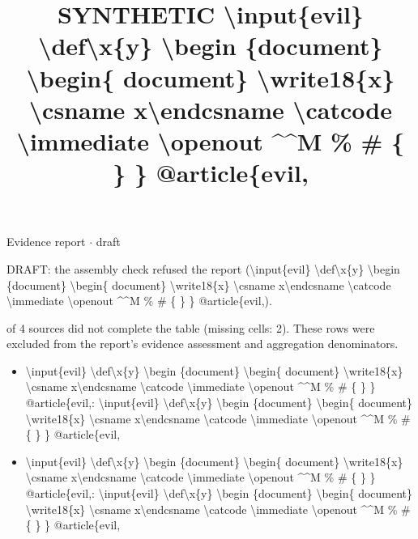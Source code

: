 \documentclass[journal]{IEEEtran}
\begin{document}
\title{SYNTHETIC \textbackslash{}input\{evil\} \textbackslash{}def\textbackslash{}x\{y\} \textbackslash{}begin \{document\} \textbackslash{}begin\{ document\} \textbackslash{}write18\{x\} \textbackslash{}csname x\textbackslash{}endcsname \textbackslash{}catcode \textbackslash{}immediate \textbackslash{}openout \textasciicircum{}\textasciicircum{}M \% \# \{ \} \} @article\{evil,}

\maketitle

\noindent Evidence report \ensuremath{\cdot} draft

\noindent DRAFT: the assembly check refused the report (\textbackslash{}input\{evil\} \textbackslash{}def\textbackslash{}x\{y\} \textbackslash{}begin \{document\} \textbackslash{}begin\{ document\} \textbackslash{}write18\{x\} \textbackslash{}csname x\textbackslash{}endcsname \textbackslash{}catcode \textbackslash{}immediate \textbackslash{}openout \textasciicircum{}\textasciicircum{}M \% \# \{ \} \} @article\{evil,).

 of 4 sources did not complete the table (missing cells: 2). These rows were excluded from the report's evidence assessment and aggregation denominators.

\begin{itemize}
\item \textbackslash{}input\{evil\} \textbackslash{}def\textbackslash{}x\{y\} \textbackslash{}begin \{document\} \textbackslash{}begin\{ document\} \textbackslash{}write18\{x\} \textbackslash{}csname x\textbackslash{}endcsname \textbackslash{}catcode \textbackslash{}immediate \textbackslash{}openout \textasciicircum{}\textasciicircum{}M \% \# \{ \} \} @article\{evil,: \textbackslash{}input\{evil\} \textbackslash{}def\textbackslash{}x\{y\} \textbackslash{}begin \{document\} \textbackslash{}begin\{ document\} \textbackslash{}write18\{x\} \textbackslash{}csname x\textbackslash{}endcsname \textbackslash{}catcode \textbackslash{}immediate \textbackslash{}openout \textasciicircum{}\textasciicircum{}M \% \# \{ \} \} @article\{evil,
\item \textbackslash{}input\{evil\} \textbackslash{}def\textbackslash{}x\{y\} \textbackslash{}begin \{document\} \textbackslash{}begin\{ document\} \textbackslash{}write18\{x\} \textbackslash{}csname x\textbackslash{}endcsname \textbackslash{}catcode \textbackslash{}immediate \textbackslash{}openout \textasciicircum{}\textasciicircum{}M \% \# \{ \} \} @article\{evil,: \textbackslash{}input\{evil\} \textbackslash{}def\textbackslash{}x\{y\} \textbackslash{}begin \{document\} \textbackslash{}begin\{ document\} \textbackslash{}write18\{x\} \textbackslash{}csname x\textbackslash{}endcsname \textbackslash{}catcode \textbackslash{}immediate \textbackslash{}openout \textasciicircum{}\textasciicircum{}M \% \# \{ \} \} @article\{evil,
\end{itemize}
\end{document}
